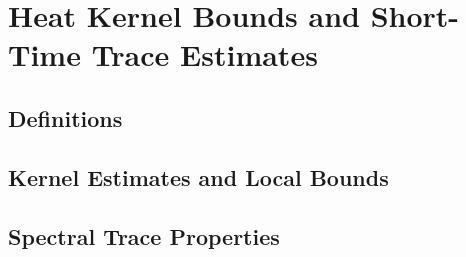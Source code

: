 \section{Heat Kernel Bounds and Short-Time Trace Estimates}
\label{sec:heat_kernel_asymptotics}



\subsection{Definitions}


\subsection{Kernel Estimates and Local Bounds}













\subsection{Spectral Trace Properties}




